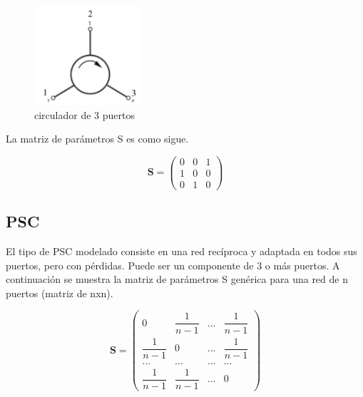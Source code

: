 \begin{figure}[H]
 \centering
 \includegraphics[width=4cm]{gfx/circulator.png}
 \caption{circulador de 3 puertos}
 \label{fig:circulator}
\end{figure}

La matriz de parámetros S es como sigue.

$$
\mathbf{S} = \begin{pmatrix} 0 & 0 & 1\\1 & 0 & 0\\0 & 1 & 0\end{pmatrix}
$$


\subsection{PSC}

El tipo de PSC modelado consiste en una red recíproca y adaptada en todos sus puertos, pero con pérdidas. Puede ser un 
componente de 3 o más puertos. A continuación se muestra la matriz de parámetros S genérica para una red de n puertos 
(matriz de nxn).

$$
\mathbf{S} = \begin{pmatrix} 0 & \dfrac{1}{n-1} & ... & \dfrac{1}{n-1}\\
							 \dfrac{1}{n-1} & 0 & ... & \dfrac{1}{n-1}\\
							 ... & ... & ... & ... \\
							 \dfrac{1}{n-1} & \dfrac{1}{n-1} & ... & 0 \end{pmatrix}
$$


